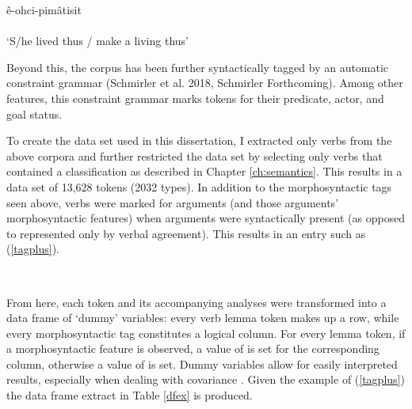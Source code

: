 \begin{exe}
\ex
\gll ê-ohci-pimâtisit \\
 \\
\trans `S/he lived thus / make a living thus'
\label{tag}
\end{exe}

Beyond this, the corpus has been further syntactically tagged by an automatic constraint grammar (Schmirler et al. 2018, Schmirler Forthcoming). Among other features, this constraint grammar marks tokens for their predicate, actor, and goal status. 

To create the data set used in this dissertation, I extracted only verbs from the above corpora and further restricted the data set by selecting only verbs that contained a classification as described in Chapter \ref{ch:semantics}. This results in a data set of 13,628 tokens (2032 types). In addition to the morphosyntactic tags seen above, verbs were marked for arguments (and those arguments' morphosyntactic features) when arguments were syntactically present (as opposed to represented only by verbal agreement). This results in an entry such as (\ref{tagplus}). 

\begin{exe}
\ex
{} \\
\label{tagplus}
\end{exe}

From here, each token and its accompanying analyses were transformed into a data frame of `dummy' variables: every verb lemma token makes up a row, while every morphosyntactic tag constitutes a logical column. For every lemma token, if a morphosyntactic feature is observed, a value of  is set for the corresponding column, otherwise a value of  is set. Dummy variables allow for easily interpreted results, especially when dealing with covariance \citep{baayen2012mixed}. Given the example of (\ref{tagplus}) the data frame extract in Table \ref{dfex} is produced.



\begin{table}
\centering
{}
\caption{Extract from Data Frame \label{dfex}
}
\end{table}

